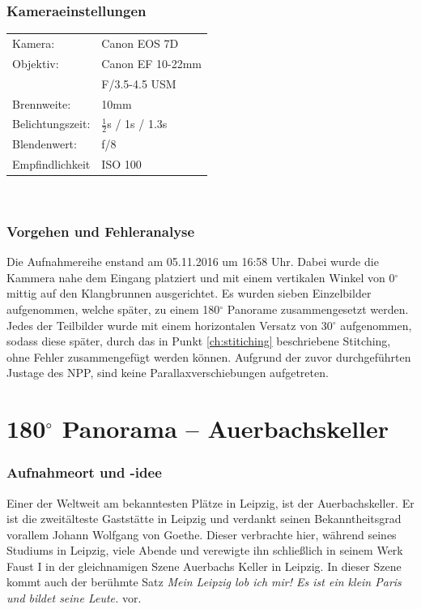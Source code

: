 \documentclass[liststotoc,bibtotoc,fontsize=14pt,]{scrreprt}
\begin{document}
		\subsubsection{Kameraeinstellungen}
		\begin{minipage}{0.58\textwidth}
			\begin{tabular}{ll}
				Kamera: &Canon EOS 7D \\
				Objektiv: &Canon EF 10-22mm \\
				& F/3.5-4.5 USM\\		
				Brennweite:& 10mm \\
				Belichtungszeit: & $\frac{1}{2}$s / 1s / 1.3s\\
				Blendenwert: & f/8\\
				Empfindlichkeit & ISO 100 \\
			\end{tabular}\\
		\end{minipage}%
		\begin{minipage}{0.42\textwidth}

		\end{minipage}%
		
	\subsubsection{Vorgehen und Fehleranalyse}
	 Die Aufnahmereihe enstand am 05.11.2016 um 16:58 Uhr. Dabei wurde die Kammera nahe dem Eingang platziert und mit einem vertikalen Winkel von 0$^\circ$ mittig auf den Klangbrunnen ausgerichtet. Es wurden sieben Einzelbilder aufgenommen, welche später, zu einem 180$^\circ$ Panorame zusammengesetzt werden. Jedes der Teilbilder wurde mit einem horizontalen Versatz von 30$^\circ$ aufgenommen, sodass diese später, durch das in Punkt \ref{ch:stitiching} beschriebene Stitching, ohne Fehler zusammengefügt werden können. Aufgrund der zuvor durchgeführten Justage des NPP, sind keine Parallaxverschiebungen aufgetreten.
	
	\section{180$^\circ$ Panorama -- Auerbachskeller}
	\label{sec:auer}
	\subsubsection{Aufnahmeort und -idee}
	Einer der Weltweit am bekanntesten Plätze in Leipzig, ist der Auerbachskeller. Er ist die zweitälteste Gaststätte in Leipzig und verdankt seinen Bekanntheitsgrad vorallem Johann Wolfgang von Goethe. Dieser verbrachte hier, während seines Studiums in Leipzig, viele Abende und verewigte ihn schließlich in seinem Werk Faust I in der gleichnamigen Szene \grqq{}Auerbachs Keller in Leipzig\grqq{}. In dieser Szene kommt auch der berühmte Satz \textit{\grqq{}Mein Leipzig lob ich mir! Es ist ein klein Paris und bildet seine Leute.\grqq{}} vor.
	
\end{document}
